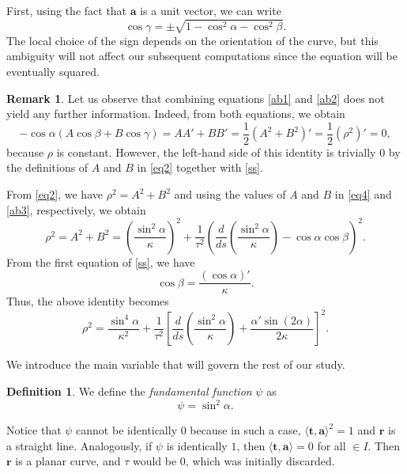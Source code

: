 \documentclass[a4paper,12pt]{amsart}
\theoremstyle{plain}
\theoremstyle{definition}
\newtheorem{definition}[theorem]{Definition}
\newtheorem{remark}[theorem]{Remark}
\newcommand{\bfr}{\mathbf{r}}
\newcommand{\bfa}{\mathbf{a}}
\newcommand{\bft}{\mathbf{t}}
\begin{document}
 

First, using the fact that $\bfa$ is a unit vector, we can write 
\begin{equation}\label{cog}
\cos\gamma = \pm\sqrt{1-\cos^2\alpha-\cos^2\beta}.
\end{equation}
 The local choice of the sign depends on the orientation of the curve, but this ambiguity will not affect our subsequent computations since the equation will be eventually squared.

\begin{remark}
Let us observe that  combining     equations   \eqref{ab1} and \eqref{ab2} does not yield any further information. Indeed, from both equations, we obtain 
$$-\cos\alpha(A\cos\beta+B\cos\gamma)=AA'+BB'=\frac12(A^2+B^2)'=\frac12(\rho^2)'=0,$$
because $\rho$ is constant. However, the left-hand side of this identity is trivially $0$ by the definitions of $A$ and $B$ in \eqref{eq2} together with \eqref{ss}.
\end{remark}

From \eqref{eq2}, we have $\rho^2=A^2+B^2$ and using the values of $A$ and $B$ in \eqref{eq4} and \eqref{ab3}, respectively, we obtain 
$$\rho^2=A^2+B^2=\left( \frac{\sin^2\alpha}{\kappa}\right)^2+\frac{1}{\tau^2}\left(\frac{d}{ds} \left(\frac{\sin^2\alpha}{\kappa}\right)-
\cos\alpha\cos\beta\right)^2.$$
From the first equation of \eqref{ss}, we have 
\begin{equation}\label{cob}
\cos\beta=\frac{(\cos\alpha)'}{\kappa}.
\end{equation}
 Thus, the above identity becomes
\begin{equation}\label{r7}
\rho^2=  \frac{\sin^4\alpha}{\kappa^2} +\frac{1}{\tau^2}\left[\frac{d}{ds} \left(\frac{\sin^2\alpha}{\kappa}\right)+\frac{\alpha'\sin(2\alpha)}{2\kappa}  \right]^2.
\end{equation}

We introduce the main variable that will govern the rest of our study.

\begin{definition}
 We define the \emph{fundamental function} $\psi$ as
\begin{equation}\label{def}
\psi = \sin^2\alpha.
\end{equation}
\end{definition}

Notice that $\psi$ cannot be identically  $0$ because in such a case, $\langle\bft,\bfa\rangle^2=1$ and $\bfr$ is a straight line.  Analogously, if $\psi$ is identically $1$, then  $\langle\bft,\bfa\rangle=0$ for all $\in I$. Then $\bfr$ is a planar curve, and $\tau$ would be $0$, which was initially discarded.
\end{document}
